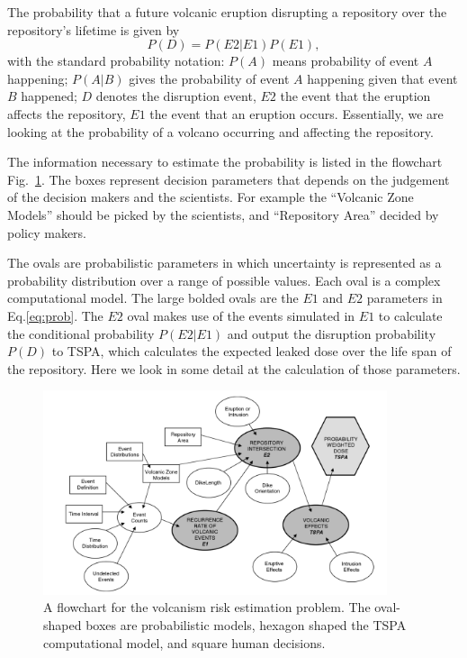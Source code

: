 \documentclass[nofootinbib,preprint,aps]{revtex4-1}
\begin{document}
        The probability that a future volcanic eruption disrupting a repository over
        the repository's lifetime is given by
        \begin{equation}
            \label{eq:prob}
            P(D) = P(E2|E1)P(E1),
        \end{equation}
        with the standard probability notation: 
        $P(A)$ means probability of event $A$ happening;
        $P(A|B)$ gives the probability of event $A$ happening given that event $B$ happened;
        $D$ denotes the disruption event,
        $E2$ the event that the eruption affects the repository, $E1$ the event that an eruption occurs.
        Essentially, we are looking at the probability of a volcano occurring and affecting the repository.

        The information necessary to estimate the probability is listed in the flowchart Fig.~\ref{fig:volcanos}.
        The boxes represent decision parameters that depends on the judgement of the decision makers and
        the scientists. For example the ``Volcanic Zone Models'' should be picked by the scientists, and
        ``Repository Area'' decided by policy makers.
        
        The ovals are probabilistic parameters in which uncertainty
        is represented as a probability distribution over a range of possible values.
        Each oval is a complex computational model.
        The large bolded ovals are the $E1$ and $E2$ parameters in Eq.\ref{eq:prob}.
        The $E2$ oval makes
        use of the events simulated in $E1$ to calculate the conditional probability $P(E2|E1)$ and output
        the disruption probability $P(D)$ to TSPA, which calculates the expected leaked dose over the
        life span of the repository. Here we look in some detail at the calculation of those parameters.
        \begin{figure}[h]
            \centering
            \includegraphics[width=0.9\textwidth]{volcano.png}
            \caption{A flowchart for the volcanism risk estimation problem. The oval-shaped
            boxes are probabilistic models, hexagon shaped the TSPA computational model, and
        square human decisions.\cite{cv14}}
            \label{fig:volcanos}
        \end{figure}
\end{document}
